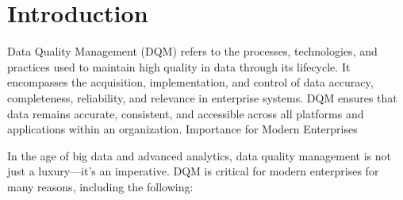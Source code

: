 \chapter*{Introduction}

Data Quality Management (DQM) refers to the processes, technologies, and practices used to maintain high quality in data through its lifecycle. It encompasses the acquisition, implementation, and control of data accuracy, completeness, reliability, and relevance in enterprise systems. DQM ensures that data remains accurate, consistent, and accessible across all platforms and applications within an organization.
Importance for Modern Enterprises

In the age of big data and advanced analytics, data quality management is not just a luxury—it's an imperative. DQM is critical for modern enterprises for many reasons, including the following:

